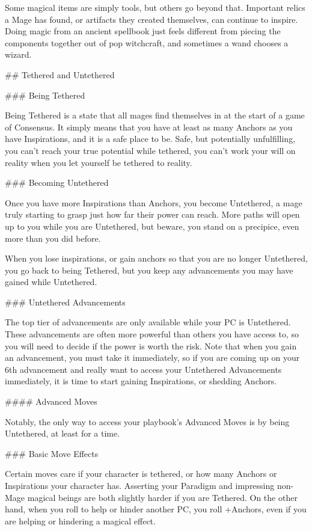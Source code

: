 \documentclass[
  oneside,
  statementpaper,
  9pt]{memoir}
\begin{document}
\begin{Player}
Some magical items are simply tools, but others go beyond that. Important relics a Mage has found, or artifacts they created themselves, can continue to inspire. Doing magic from an ancient spellbook just feels different from piecing the components together out of pop witchcraft, and sometimes a wand chooses a wizard.

## Tethered and Untethered

### Being Tethered

Being Tethered is a state that all mages find themselves in at the start of a game of Consensus. It simply means that you have at least as many Anchors as you have Inspirations, and it is a safe place to be. Safe, but potentially unfulfilling, you can’t reach your true potential while tethered, you can’t work your will on reality when you let yourself be tethered to reality.

### Becoming Untethered

Once you have more Inspirations than Anchors, you become Untethered, a mage truly starting to grasp just how far their power can reach. More paths will open up to you while you are Untethered, but beware, you stand on a precipice, even more than you did before.

When you lose inspirations, or gain anchors so that you are no longer Untethered, you go back to being Tethered, but you keep any advancements you may have gained while Untethered.

### Untethered Advancements

The top tier of advancements are only available while your PC is Untethered. These advancements are often more powerful than others you have access to, so you will need to decide if the power is worth the risk. Note that when you gain an advancement, you must take it immediately, so if you are coming up on your 6th advancement and really want to access your Untethered Advancements immediately, it is time to start gaining Inspirations, or shedding Anchors.

#### Advanced Moves

Notably, the only way to access your playbook’s Advanced Moves is by being Untethered, at least for a time. 

### Basic Move Effects

Certain moves care if your character is tethered, or how many Anchors or Inspirations your character has. Asserting your Paradigm and impressing non-Mage magical beings are both slightly harder if you are Tethered. On the other hand, when you roll to help or hinder another PC, you roll +Anchors, even if you are helping or hindering a magical effect.


\end{Player}
\end{document}

